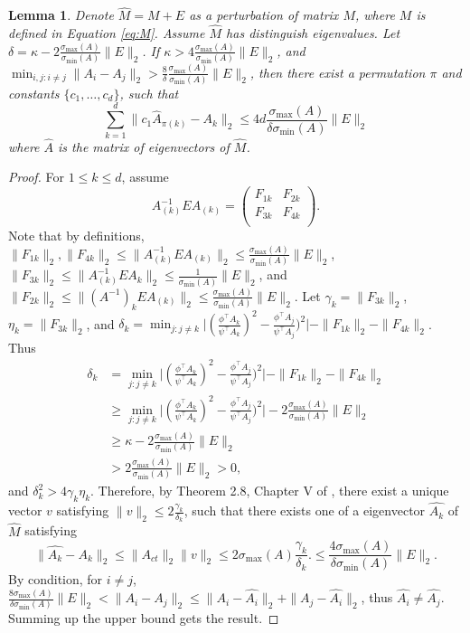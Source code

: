 \documentclass[english]{article} %
\newtheorem{lemma}{Lemma}[section]
\theoremstyle{definition}
\begin{document}
\begin{lemma}
\label{lem:eigenvectorvariation}
Denote $\widehat{M} = M+E$ as a perturbation of matrix $M$, where $M$ is defined in Equation \eqref{eq:M}. 
Assume $\widehat{M}$ has distinguish eigenvalues. Let $\delta = \kappa -  2 \frac{\sigma_{\max}(A)}{\sigma_{\min}(A)}\|E\|_2$. 
If $\kappa > 4 \frac{\sigma_{\max}(A)}{\sigma_{\min}(A)}\|E\|_2$, and $\min_{i,j:i\neq j} \|A_i - A_j\|_2 > \frac{8}{\delta}\frac{\sigma_{\max}(A)}{\sigma_{\min}(A) } \|E\|_2$, then there exist a permutation $\pi$ and constants $\{c_1,\ldots,c_d\}$, such that 
\[
\sum_{k=1}^{d}\| c_1\widehat{A}_{\pi(k)} - A_k\|_2 \le 4d  \frac{\sigma_{\max}(A)}{\delta \sigma_{\min}(A) } \|E\|_2
\]
where $\widehat{A}$ is the matrix of eigenvectors of $\widehat{M}$. 
\end{lemma}

\begin{proof}
For $1\le k\le d$, assume 
\[
A_{(k)}^{-1} E A_{(k)} =  
\left(
\begin{array}{cc}
F_{1k} & F_{2k}\\
F_{3k} & F_{4k} \\
\end{array} 
\right). 
\] 
Note that by definitions, $\|F_{1k}\|_2,\|F_{4k}\|_2\le\|A_{(k)}^{-1} E A_{(k)}\|_2\le\frac{\sigma_{\max}(A)}{\sigma_{\min}(A)}\|E\|_2$,
 $\|F_{3k}\|_2\le\|A_{(k)}^{-1}EA_{k}\|_2\le\frac{1}{\sigma_{\min}(A)}\|E\|_2$,
 and $\|F_{2k}\|_2\le\|(A^{-1})_kEA_{(k)}\|_2\le\frac{\sigma_{\max}(A)}{\sigma_{\min}(A)}\|E\|_2$.
Let $\gamma_k = \|F_{3k}\|_2$, $\eta_k = \|F_{3k}\|_2$, and $\delta_k = \min_{j: j\neq k} \vert (\frac{\phi^{\top}A_k}{\psi^{\top}A_k})^2 - \frac{\phi^{\top}A_j}{\psi^{\top}A_j})^2 \vert - \|F_{1k}\|_2 - \|F_{4k}\|_2$. Thus 
\begin{align*}
\delta_k & = \min_{j:j\neq k} \vert (\frac{\phi^{\top}A_k}{\psi^{\top}A_k})^2 - \frac{\phi^{\top}A_j}{\psi^{\top}A_j})^2 \vert - \|F_{1k}\|_2 - \|F_{4k}\|_2\\
	& \ge \min_{j:j\neq k} \vert (\frac{\phi^{\top}A_k}{\psi^{\top}A_k})^2 - \frac{\phi^{\top}A_j}{\psi^{\top}A_j})^2 \vert - 2 \frac{\sigma_{\max}(A)}{\sigma_{\min}(A)}\|E\|_2\\
	& \ge  \kappa -  2 \frac{\sigma_{\max}(A)}{\sigma_{\min}(A)}\|E\|_2\\
	& >  2 \frac{\sigma_{\max}(A)}{\sigma_{\min}(A)}\|E\|_2 >0,
\end{align*}
and $\delta_k^2 > 4\gamma_k\eta_k$. 
Therefore, by Theorem 2.8, Chapter V of \citep{stewart1990matrix}, there exist a unique vector $v$ satisfying $\|v\|_2\le 2\frac{\gamma_k}{\delta_k}$, such that there exists one of a eigenvector $\widehat{A_k}$ of $\widehat{M}$ satisfying
 \[
 \|\widehat{A_k} - A_k\|_2 \le \|A_{ct}\|_2 \|v\|_2 \le 2\sigma_{\max}(A)\frac{\gamma_k}{\delta_k}.\le \frac{4\sigma_{\max}(A)}{\delta \sigma_{\min}(A) } \|E\|_2.
 \]
 By condition, for $i\neq j$,  $\frac{8\sigma_{\max}(A)}{\delta \sigma_{\min}(A) } \|E\|_2 < \|A_i - A_j\|_2\le \|A_i - \widehat{A_i}\|_2 + \|A_j - \widehat{A_i}\|_2$, thus $\widehat{A_i} \neq \widehat{A_j}$.  Summing up the upper bound gets the result. 
\end{proof}
\end{document}
